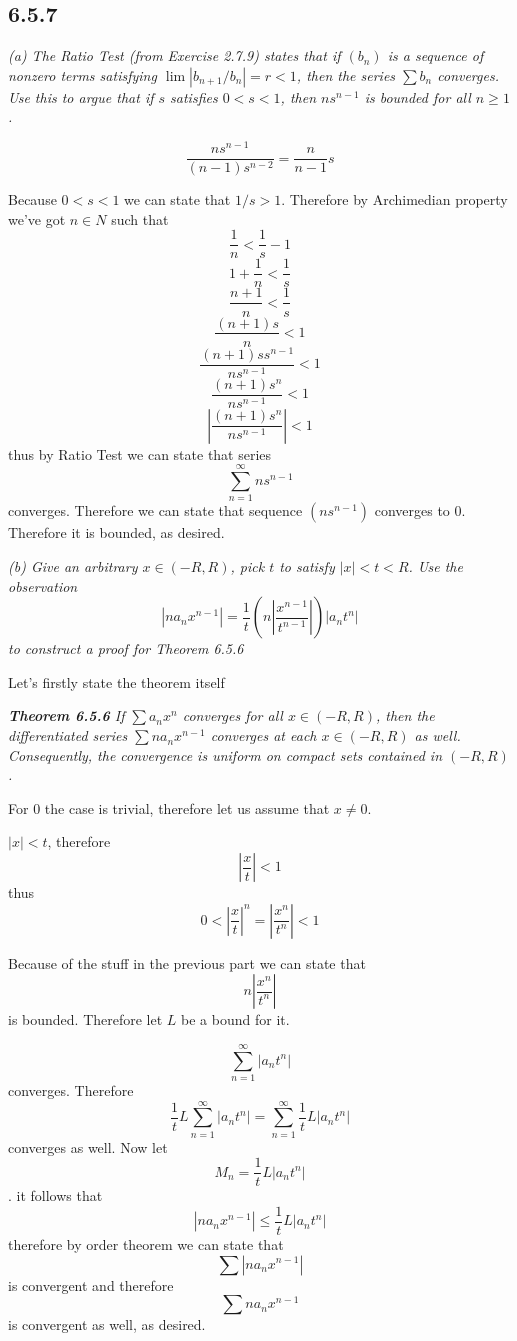 \documentclass[11pt,oneside,titlepage]{book}
\begin{document}
\subsection*{6.5.7}

\textit{(a) The Ratio Test (from Exercise 2.7.9) states that if $(b_n)$ is
  a sequence of nonzero terms satisfying $\lim{|b_{n + 1}/b_n| = r < 1}$,
  then the series $\sum b_n$ converges. Use this to argue that if $s$
  satisfies $0 < s < 1$, then $ns^{n - 1}$ is bounded for all $n \geq 1$.}

$$\frac{ns^{n - 1}}{(n - 1)s^{n - 2}} = \frac{n}{n - 1}s$$

Because $0 < s < 1$ we can state that $1/s > 1$. Therefore by
Archimedian property we've got $n \in N$ such that 
$$\frac{1}{n} < \frac{1}{s} - 1$$
$$1 + \frac{1}{n} < \frac{1}{s}$$
$$\frac{n + 1}{n} < \frac{1}{s}$$
$$\frac{(n + 1)s}{n} < 1$$
$$\frac{(n + 1)s s^{n - 1}}{n s^{n - 1}} < 1$$
$$\frac{(n + 1)s^n }{n s^{n - 1}} < 1$$
$$\left|\frac{(n + 1)s^n}{n s^{n - 1}}\right| < 1$$
thus by Ratio Test we can state that series
$$\sum_{n = 1}^{\infty}{n s^{n - 1}}$$
converges. Therefore we can state that sequence $(n s^{n - 1})$ converges to
$0$. Therefore it is bounded, as desired.

\textit{(b) Give an arbitrary $x \in (-R, R)$, pick $t$ to satisfy
  $|x| < t < R$. Use the observation }
$$|na_nx^{n - 1}| = \frac{1}{t}\left(n\left|\frac{x^{n - 1}}{t^{n - 1}}\right|
\right)|a_n t^n|$$
\textit{to construct a proof for Theorem 6.5.6}

Let's firstly state the theorem itself

\textit{\textbf{Theorem 6.5.6} If $\sum a_n x^n$ converges for all
  $x \in (-R, R)$, then the differentiated series $\sum{n a_n x^{n - 1}}$
  converges at each $x \in (-R, R)$ as well. Consequently, the
  convergence is uniform on compact sets contained in $(-R, R)$.}

For $0$ the case is trivial, therefore let us assume that $x \neq 0$.

$|x| < t$, therefore
$$\left|\frac{x}{t}\right| < 1$$
thus
$$0 < \left|\frac{x}{t}\right|^n = \left|\frac{x^n}{t^n}\right| < 1$$

Because of the stuff in the previous part we can state that
$$n \left|\frac{x^n}{t^n}\right|$$
is bounded. Therefore let $L$ be a bound for it.

$$\sum_{n = 1}^{\infty} {|a_n t^n|}$$
converges. Therefore
$$\frac{1}{t} L \sum_{n = 1}^{\infty} {|a_n t^n|}
=  \sum_{n = 1}^{\infty} {\frac{1}{t} L|a_n t^n|} $$
converges as well. Now let
$$M_n = \frac{1}{t} L|a_n t^n|$$.
it follows that
$$|n a_n x^{n - 1}| \leq \frac{1}{t} L|a_n t^n|$$
therefore by order theorem we can state that
$$\sum{|n a_n x^{n - 1}|}$$
is convergent and therefore
$$\sum{n a_n x^{n - 1}}$$
is convergent as well, as desired.
\end{document}
